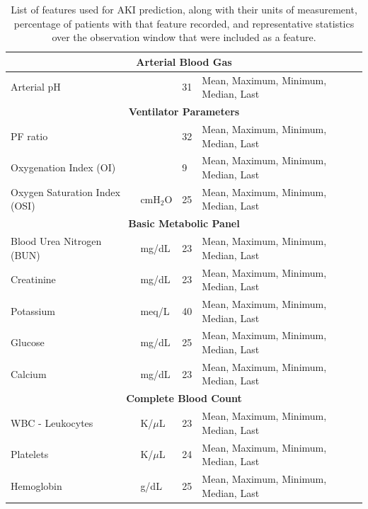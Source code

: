 \documentclass[
   technote
]{phildoc}
\begin{document}
\begin{table}[!htbp] \centering \caption{List of features used for AKI prediction, along with their units of measurement, percentage of patients with that feature recorded, and representative statistics over the observation window that were included as a feature.}
\label{tab:features}
\begin{tabular}{| l | l | l | l |  }
\hline
\multicolumn{4}{|c|}{\textbf{Arterial Blood Gas}} \\
\hline
Arterial pH					&			&	31	&	Mean, Maximum, Minimum, Median, Last\\

\hline
\multicolumn{4}{|c|}{\textbf{Ventilator Parameters}} \\
\hline
PF ratio					&						&	32	&	Mean, Maximum, Minimum, Median, Last\\
Oxygenation Index (OI)		&						&	9	&	Mean, Maximum, Minimum, Median, Last\\
Oxygen Saturation Index (OSI)	&	$\text{cmH}_2\text{O}$	&	25	&	Mean, Maximum, Minimum, Median, Last\\

\hline
\multicolumn{4}{|c|}{\textbf{Basic Metabolic Panel}} \\
\hline
Blood Urea Nitrogen (BUN)		&	mg/dL	&	23	&	Mean, Maximum, Minimum, Median, Last\\
Creatinine					&	mg/dL	&	23	&	Mean, Maximum, Minimum, Median, Last\\
Potassium					&	meq/L	&	40	&	Mean, Maximum, Minimum, Median, Last\\
Glucose					&	mg/dL	&	25	&	Mean, Maximum, Minimum, Median, Last\\
Calcium					&	mg/dL	&	23	&	Mean, Maximum, Minimum, Median, Last\\

\hline
\multicolumn{4}{|c|}{\textbf{Complete Blood Count}} \\
\hline
WBC - Leukocytes			&	K/$\mu$L	&	23	&	Mean, Maximum, Minimum, Median, Last\\
Platelets					&	K/$\mu$L	&	24	&	Mean, Maximum, Minimum, Median, Last\\
Hemoglobin				&	g/dL		&	25	&	Mean, Maximum, Minimum, Median, Last\\


\end{tabular}
\end{table}
\end{document}
